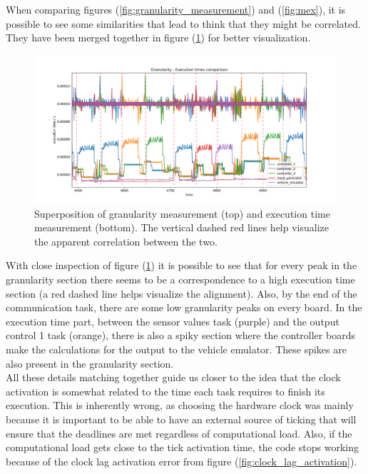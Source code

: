 \documentclass[table,xcdraw]{article}
\begin{document}
When comparing figures (\ref{fig:granularity_measurement}) and (\ref{fig:mex}), it is possible to see some similarities that lead to think that they might be correlated. They have been merged together in figure (\ref{fig:mex_gr_comparison}) for better visualization.\\

\begin{figure}[h!]
    \centering
    \includegraphics[width=\textwidth]{figures/discussion/mex_gr_comparison.png}
    \caption{Superposition of granularity measurement (top) and execution time measurement (bottom). The vertical dashed red lines help visualize the apparent correlation between the two.}
    \label{fig:mex_gr_comparison}
\end{figure}

With close inspection of figure (\ref{fig:mex_gr_comparison}) it is possible to see that for every peak in the granularity section there seems to be a correspondence to a high execution time section (a red dashed line helps visualize the alignment). Also, by the end of the communication task, there are some low granularity peaks on every board. In the execution time part, between the sensor values task (purple) and the output control 1 task (orange), there is also a spiky section where the controller boards make the calculations for the output to the vehicle emulator. These spikes are also present in the granularity section.\\

All these details matching together guide us closer to the idea that the clock activation is somewhat related to the time each task requires to finish its execution. This is inherently wrong, as choosing the hardware clock was mainly because it is important to be able to have an external source of ticking that will ensure that the deadlines are met regardless of computational load. Also, if the computational load gets close to the tick activation time, the code stops working because of the clock lag activation error from figure (\ref{fig:clock_lag_activation}).\\
\end{document}
